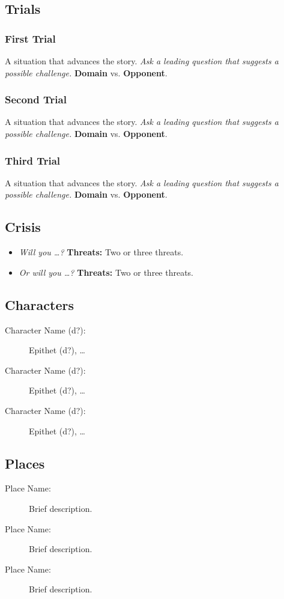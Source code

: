 \documentclass[11pt, a5paper, parskip=half-, DIV=12]{scrartcl}
\begin{document}
\subsection*{Trials}
\subsubsection*{First Trial}
A situation that advances the story. \textit{Ask a leading question that suggests a possible challenge.} \textbf{Domain} vs. \textbf{Opponent}.

\subsubsection*{Second Trial}
A situation that advances the story. \textit{Ask a leading question that suggests a possible challenge.} \textbf{Domain} vs. \textbf{Opponent}.

\subsubsection*{Third Trial}
A situation that advances the story. \textit{Ask a leading question that suggests a possible challenge.} \textbf{Domain} vs. \textbf{Opponent}.

\subsection*{Crisis}

\begin{itemize}
	\item \textit{Will you \ldots?} \textbf{Threats:} Two or three threats.
	\item \textit{Or will you \ldots?} \textbf{Threats:} Two or three threats.
\end{itemize}

\newpage

\subsection*{Characters}
\begin{description}
	\item[Character Name (d?):] Epithet (d?), \ldots
	\item[Character Name (d?):] Epithet (d?), \ldots
	\item[Character Name (d?):] Epithet (d?), \ldots
\end{description}

\subsection*{Places}
\begin{description}
	\item[Place Name:] Brief description.
	\item[Place Name:] Brief description.
	\item[Place Name:] Brief description.
\end{description}
\end{document}
